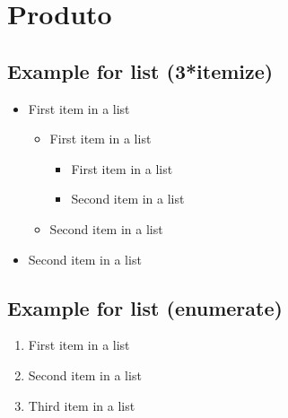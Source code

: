 \documentclass[paper=a4, fontsize=11pt]{scrartcl}
\numberwithin{equation}{section}		%
\numberwithin{figure}{section}			%
\numberwithin{table}{section}				%
\begin{document}
\section{Produto}

\subsection{Example for list (3*itemize)}
\begin{itemize}
	\item First item in a list 
		\begin{itemize}
		\item First item in a list 
			\begin{itemize}
			\item First item in a list 
			\item Second item in a list 
			\end{itemize}
		\item Second item in a list 
		\end{itemize}
	\item Second item in a list 
\end{itemize}

\subsection{Example for list (enumerate)}
\begin{enumerate}
	\item First item in a list 
	\item Second item in a list 
	\item Third item in a list
\end{enumerate}


\end{document}
